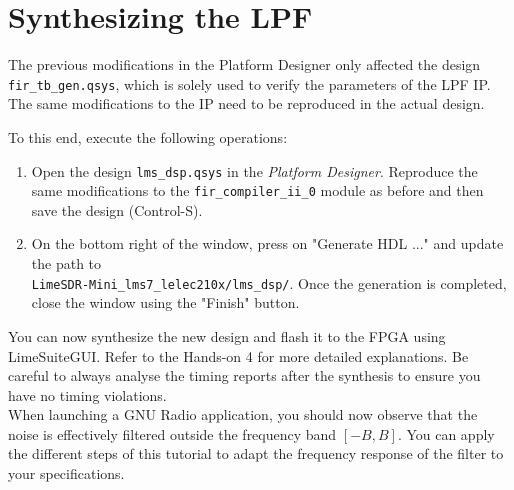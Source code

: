 \section{Synthesizing the LPF}

The previous modifications in the Platform Designer only affected the design \texttt{fir\_tb\_gen.qsys}, which is solely used to verify the parameters of the LPF IP. The same modifications to the IP need to be reproduced in the actual design.

To this end, execute the following operations:
\begin{enumerate}
    \item Open the design \texttt{lms\_dsp.qsys} in the \textit{Platform Designer}. Reproduce the same modifications to the \texttt{fir\_compiler\_ii\_0} module as before and then save the design (Control-S).
    \item On the bottom right of the window, press on "Generate HDL ..." and update the path to \\
    \texttt{LimeSDR-Mini\_lms7\_lelec210x/lms\_dsp/}. Once the generation is completed, close the window using the "Finish" button.
\end{enumerate}

You can now synthesize the new design and flash it to the FPGA using LimeSuiteGUI. Refer to the Hands-on 4 for more detailed explanations. Be careful to always analyse the timing reports after the synthesis to ensure you have no timing violations. \\


When launching a GNU Radio application, you should now observe that the noise is effectively filtered outside the frequency band $[-B, B]$. You can apply the different steps of this tutorial to adapt the frequency response of the filter to your specifications.
